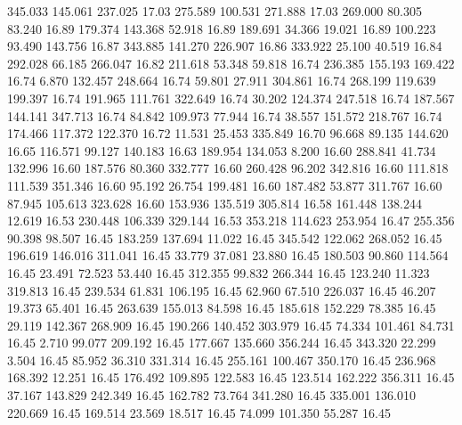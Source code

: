  345.033  145.061  237.025        17.03
 275.589  100.531  271.888        17.03
 269.000   80.305   83.240        16.89
 179.374  143.368   52.918        16.89
 189.691   34.366   19.021        16.89
 100.223   93.490  143.756        16.87
 343.885  141.270  226.907        16.86
 333.922   25.100   40.519        16.84
 292.028   66.185  266.047        16.82
 211.618   53.348   59.818        16.74
 236.385  155.193  169.422        16.74
   6.870  132.457  248.664        16.74
  59.801   27.911  304.861        16.74
 268.199  119.639  199.397        16.74
 191.965  111.761  322.649        16.74
  30.202  124.374  247.518        16.74
 187.567  144.141  347.713        16.74
  84.842  109.973   77.944        16.74
  38.557  151.572  218.767        16.74
 174.466  117.372  122.370        16.72
  11.531   25.453  335.849        16.70
  96.668   89.135  144.620        16.65
 116.571   99.127  140.183        16.63
 189.954  134.053    8.200        16.60
 288.841   41.734  132.996        16.60
 187.576   80.360  332.777        16.60
 260.428   96.202  342.816        16.60
 111.818  111.539  351.346        16.60
  95.192   26.754  199.481        16.60
 187.482   53.877  311.767        16.60
  87.945  105.613  323.628        16.60
 153.936  135.519  305.814        16.58
 161.448  138.244   12.619        16.53
 230.448  106.339  329.144        16.53
 353.218  114.623  253.954        16.47
 255.356   90.398   98.507        16.45
 183.259  137.694   11.022        16.45
 345.542  122.062  268.052        16.45
 196.619  146.016  311.041        16.45
  33.779   37.081   23.880        16.45
 180.503   90.860  114.564        16.45
  23.491   72.523   53.440        16.45
 312.355   99.832  266.344        16.45
 123.240   11.323  319.813        16.45
 239.534   61.831  106.195        16.45
  62.960   67.510  226.037        16.45
  46.207   19.373   65.401        16.45
 263.639  155.013   84.598        16.45
 185.618  152.229   78.385        16.45
  29.119  142.367  268.909        16.45
 190.266  140.452  303.979        16.45
  74.334  101.461   84.731        16.45
   2.710   99.077  209.192        16.45
 177.667  135.660  356.244        16.45
 343.320   22.299    3.504        16.45
  85.952   36.310  331.314        16.45
 255.161  100.467  350.170        16.45
 236.968  168.392   12.251        16.45
 176.492  109.895  122.583        16.45
 123.514  162.222  356.311        16.45
  37.167  143.829  242.349        16.45
 162.782   73.764  341.280        16.45
 335.001  136.010  220.669        16.45
 169.514   23.569   18.517        16.45
  74.099  101.350   55.287        16.45
